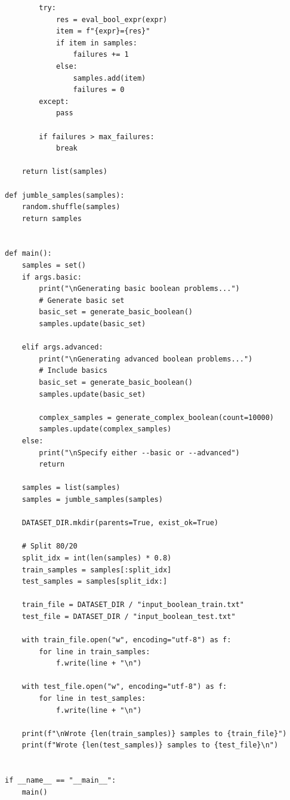 \begin{verbatim}
        try:
            res = eval_bool_expr(expr)
            item = f"{expr}={res}"
            if item in samples:
                failures += 1
            else:
                samples.add(item)
                failures = 0
        except:
            pass
            
        if failures > max_failures:
            break
            
    return list(samples)

def jumble_samples(samples):
    random.shuffle(samples)
    return samples


def main():
    samples = set()
    if args.basic:
        print("\nGenerating basic boolean problems...")
        # Generate basic set
        basic_set = generate_basic_boolean()
        samples.update(basic_set)
            
    elif args.advanced:
        print("\nGenerating advanced boolean problems...")
        # Include basics
        basic_set = generate_basic_boolean()
        samples.update(basic_set)
             
        complex_samples = generate_complex_boolean(count=10000)
        samples.update(complex_samples)
    else:
        print("\nSpecify either --basic or --advanced")
        return
    
    samples = list(samples)
    samples = jumble_samples(samples)

    DATASET_DIR.mkdir(parents=True, exist_ok=True)
    
    # Split 80/20
    split_idx = int(len(samples) * 0.8)
    train_samples = samples[:split_idx]
    test_samples = samples[split_idx:]
    
    train_file = DATASET_DIR / "input_boolean_train.txt"
    test_file = DATASET_DIR / "input_boolean_test.txt"

    with train_file.open("w", encoding="utf-8") as f:
        for line in train_samples:
            f.write(line + "\n")
            
    with test_file.open("w", encoding="utf-8") as f:
        for line in test_samples:
            f.write(line + "\n")

    print(f"\nWrote {len(train_samples)} samples to {train_file}")
    print(f"Wrote {len(test_samples)} samples to {test_file}\n")


if __name__ == "__main__":
    main()
\end{verbatim}

